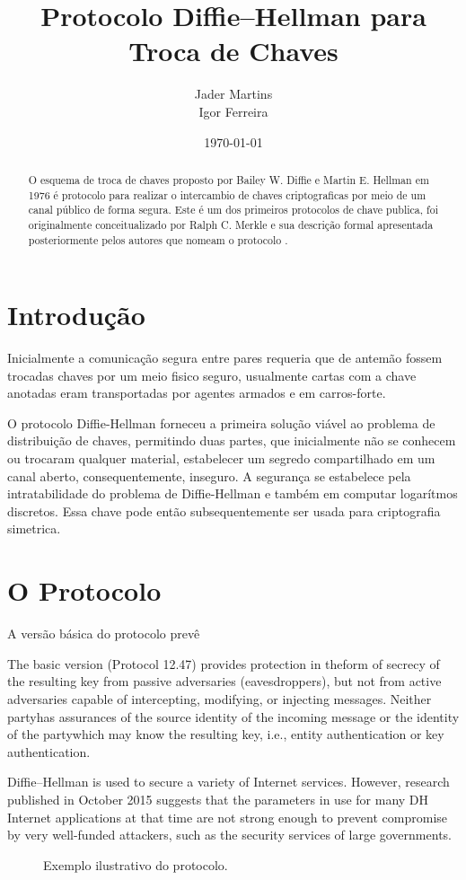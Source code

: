 \documentclass{article}
\title{Protocolo Diffie–Hellman para Troca de Chaves}
\author{Jader Martins\\
        Igor Ferreira}
\date{\today}
\begin{document}
\maketitle

\begin{abstract}
    O esquema de troca de chaves proposto por Bailey W. Diffie e
    Martin E. Hellman em 1976 é protocolo para realizar
    o intercambio de chaves criptograficas por meio de um canal público
    de forma segura\cite{Diffie}. Este é um dos primeiros protocolos de
    chave publica, foi originalmente conceitualizado por Ralph C. Merkle
    e sua descrição formal apresentada posteriormente pelos autores que
    nomeam o protocolo \cite{Merkle}.
\end{abstract}

\section{Introdução}%
\label{sec:introducao}
Inicialmente a comunicação segura entre pares requeria que de antemão fossem
trocadas chaves por um meio fisico seguro, usualmente cartas com a chave
anotadas eram transportadas por agentes armados e em carros-forte.

O protocolo Diffie-Hellman forneceu a primeira solução viável ao problema
de distribuição de chaves, permitindo duas partes, que inicialmente não se
conhecem ou trocaram qualquer material, estabelecer um segredo compartilhado
em um canal aberto, consequentemente, inseguro. A segurança se estabelece
pela intratabilidade do problema de Diffie-Hellman e também em computar
logarítmos discretos\cite{katz1996handbook}. Essa chave pode então
subsequentemente ser usada para criptografia simetrica.


\section{O Protocolo}%
\label{sec:o_protocolo}



A versão básica do protocolo prevê

The basic version (Protocol 12.47) provides protection in theform of secrecy of the resulting key from passive adversaries (eavesdroppers), but not from active adversaries capable of intercepting, modifying, or injecting messages. Neither partyhas assurances of the source identity of the incoming message or the identity of the partywhich may know the resulting key, i.e., entity authentication or key authentication.

Diffie–Hellman is used to secure a variety of Internet services. However, research published in October 2015 suggests that the parameters in use for many DH Internet applications at that time are not strong enough to prevent compromise by very well-funded attackers, such as the security services of large governments.

\begin{figure}[htpb]
    \centering
    
    \caption{Exemplo ilustrativo do protocolo.}%
    \label{fig:diagram}
\end{figure}



\end{document}
